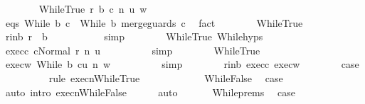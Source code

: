 \begin{isabellebody}
\ \ \ \ \ \ \isamarkupfalse%
\ {\isacharparenleft}WhileTrue\ r\ b{\isacharprime}\ c{\isacharprime}{\isacharprime}\ n\ u\ w{\isacharparenright}\isanewline
\ \ \ \ \ \ \isamarkupfalse%
\ eqs{\isacharcolon}\ {\isachardoublequoteopen}While\ b{\isacharprime}\ c{\isacharprime}{\isacharprime}\ {\isacharequal}\ While\ b\ {\isacharparenleft}merge{\isacharunderscore}guards\ c{\isacharparenright}{\isachardoublequoteclose}\ \isamarkupfalse%
\ fact\isanewline
\ \ \ \ \ \ \isamarkupfalse%
\ WhileTrue\ \isanewline
\ \ \ \ \ \ \isamarkupfalse%
\ r{\isacharunderscore}in{\isacharunderscore}b{\isacharcolon}\ {\isachardoublequoteopen}r\ {\isasymin}\ b{\isachardoublequoteclose}\ \isanewline
\ \ \ \ \ \ \ \ \isamarkupfalse%
\ simp\isanewline
\ \ \ \ \ \ \isamarkupfalse%
\ WhileTrue\ While{\isachardot}hyps\ \isamarkupfalse%
\ exec{\isacharunderscore}c{\isacharcolon}\ {\isachardoublequoteopen}{\isasymGamma}{\isasymturnstile}{\isasymlangle}c{\isacharcomma}Normal\ r{\isasymrangle}\ {\isacharequal}n{\isasymRightarrow}\ u{\isachardoublequoteclose}\isanewline
\ \ \ \ \ \ \ \ \isamarkupfalse%
\ simp\isanewline
\ \ \ \ \ \ \isamarkupfalse%
\ WhileTrue\ \isamarkupfalse%
\ exec{\isacharunderscore}w{\isacharcolon}\ {\isachardoublequoteopen}{\isasymGamma}{\isasymturnstile}{\isasymlangle}While\ b\ c{\isacharcomma}u{\isasymrangle}\ {\isacharequal}n{\isasymRightarrow}\ w{\isachardoublequoteclose}\isanewline
\ \ \ \ \ \ \ \ \isamarkupfalse%
\ simp\isanewline
\ \ \ \ \ \ \isamarkupfalse%
\ r{\isacharunderscore}in{\isacharunderscore}b\ exec{\isacharunderscore}c\ exec{\isacharunderscore}w\isanewline
\ \ \ \ \ \ \isamarkupfalse%
\ {\isacharquery}case\isanewline
\ \ \ \ \ \ \ \ \isamarkupfalse%
\ {\isacharparenleft}rule\ execn{\isachardot}WhileTrue{\isacharparenright}\isanewline
\ \ \ \ \isamarkupfalse%
\isanewline
\ \ \ \ \ \ \isamarkupfalse%
\ WhileFalse\ \isamarkupfalse%
\ {\isacharquery}case\ \isamarkupfalse%
\ {\isacharparenleft}auto\ intro{\isacharcolon}\ execn{\isachardot}WhileFalse{\isacharparenright}\isanewline
\ \ \ \ \isamarkupfalse%
\ auto\isanewline
\ \ \isacommand{{\isacharbraceright}}\isamarkupfalse%
\isanewline
\ \ \isamarkupfalse%
\ While{\isachardot}prems\ \isamarkupfalse%
\ {\isacharquery}case\isanewline
\ \ \ \ \isamarkupfalse%

\end{isabellebody}

